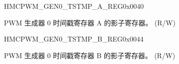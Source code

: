 \begin{register}{H}{MCPWM\_GEN0\_TSTMP\_A\_REG}{0x0040}\label{regdesc:MCPWMGEN0TSTMPAREG}
%
%
\regnewline%
\begin{regdesc}\begin{reglist}
\label{fielddesc:MCPWMGEN0A}\item [MCPWM\_GEN0\_A] PWM 生成器 0 时间戳寄存器 A 的影子寄存器。 (R/W)
\end{reglist}\end{regdesc}
\end{register}


\begin{register}{H}{MCPWM\_GEN0\_TSTMP\_B\_REG}{0x0044}\label{regdesc:MCPWMGEN0TSTMPBREG}
%
%
\regnewline%
\begin{regdesc}\begin{reglist}
\label{fielddesc:MCPWMGEN0B}\item [MCPWM\_GEN0\_B] PWM 生成器 0 时间戳寄存器 B 的影子寄存器。 (R/W)
\end{reglist}\end{regdesc}
\end{register}


